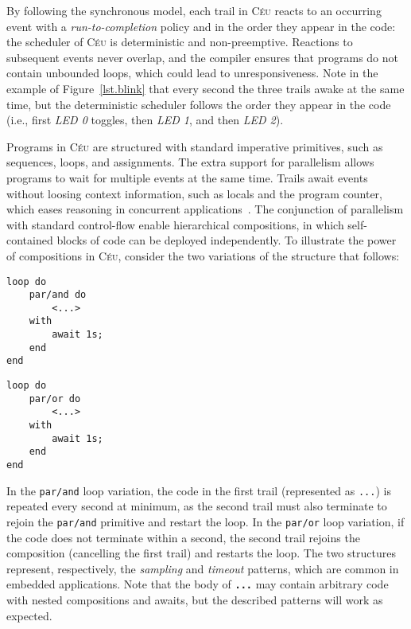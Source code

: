 \documentclass{sig-alternate-ipsn13}
\newcommand{\CEU}{\textsc{C\'{e}u}\xspace}
\newcommand{\code}[1] {{\small{\texttt{#1}}}}
\begin{document}
By following the synchronous model, each trail in \CEU reacts to an occurring 
event with a \emph{run-to-completion} policy and in the order they appear in 
the code: the scheduler of \CEU is deterministic and non-preemptive.
%
Reactions to subsequent events never overlap, and the compiler ensures that 
programs do not contain unbounded loops, which could lead to unresponsiveness.
%
Note in the example of Figure~\ref{lst.blink} that every second the three 
trails awake at the same time, but the deterministic scheduler follows the 
order they appear in the code (i.e., first \emph{LED 0} toggles, then \emph{LED 
1}, and then \emph{LED 2}).

Programs in \CEU are structured with standard imperative primitives, such as 
sequences, loops, and assignments.
The extra support for parallelism allows programs to wait for multiple events 
at the same time.
Trails await events without loosing context information, such as locals and the 
program counter, which eases reasoning in concurrent 
applications~\cite{sync_async.cooperative}.
%
The conjunction of parallelism with standard control-flow enable hierarchical 
compositions, in which self-contained blocks of code can be deployed 
independently.
%
To illustrate the power of compositions in \CEU, consider the two variations of 
the structure that follows:

\begin{minipage}[t]{0.35\linewidth}
\begin{lstlisting}
loop do
    par/and do
        <...>
    with
        await 1s;
    end
end
\end{lstlisting}
\end{minipage}
%
\hspace{1cm}
%
\begin{minipage}[t]{0.35\linewidth}
\begin{lstlisting}
loop do
    par/or do
        <...>
    with
        await 1s;
    end
end
\end{lstlisting}
\end{minipage}

In the \code{par/and} loop variation, the code in the first trail (represented 
as \code{...}) is repeated every second at minimum, as the second trail must 
also terminate to rejoin the \code{par/and} primitive and restart the loop.
%
In the \code{par/or} loop variation, if the code does not terminate within a 
second, the second trail rejoins the composition (cancelling the first trail) 
and restarts the loop.
%
The two structures represent, respectively, the \emph{sampling} and 
\emph{timeout} patterns, which are common in embedded applications.
%
Note that the body of \textbf{\code{...}} may contain arbitrary code with 
nested compositions and awaits, but the described patterns will work as 
expected.
\end{document}
